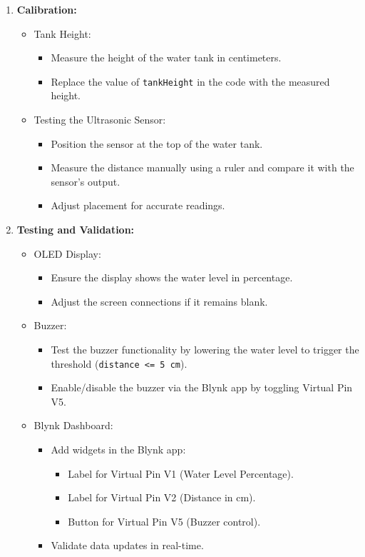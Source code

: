 {{\begin{enumerate}
    \item \textbf{Calibration:}
    \begin{itemize}
        \item Tank Height:
        \begin{itemize}
            \item Measure the height of the water tank in centimeters.
            \item Replace the value of \texttt{tankHeight} in the code with the measured height.
        \end{itemize}
        \item Testing the Ultrasonic Sensor:
        \begin{itemize}
            \item Position the sensor at the top of the water tank.
            \item Measure the distance manually using a ruler and compare it with the sensor's output.
            \item Adjust placement for accurate readings.
        \end{itemize}
    \end{itemize}
    
    \item \textbf{Testing and Validation:}
    \begin{itemize}
        \item OLED Display:
        \begin{itemize}
            \item Ensure the display shows the water level in percentage.
            \item Adjust the screen connections if it remains blank.
        \end{itemize}
        \item Buzzer:
        \begin{itemize}
            \item Test the buzzer functionality by lowering the water level to trigger the threshold (\texttt{distance <= 5 cm}).
            \item Enable/disable the buzzer via the Blynk app by toggling Virtual Pin V5.
        \end{itemize}
        \item Blynk Dashboard:
        \begin{itemize}
            \item Add widgets in the Blynk app:
            \begin{itemize}
                \item Label for Virtual Pin V1 (Water Level Percentage).
                \item Label for Virtual Pin V2 (Distance in cm).
                \item Button for Virtual Pin V5 (Buzzer control).
            \end{itemize}
            \item Validate data updates in real-time.
        \end{itemize}
    \end{itemize}
    

\end{enumerate}}}
